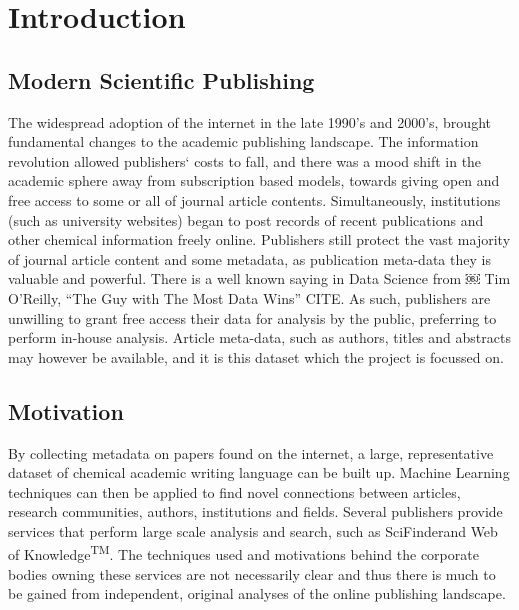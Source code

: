 \chapter{Introduction}
\section{Modern Scientific Publishing}
The widespread adoption of the internet in the late 1990’s and 2000’s, brought  fundamental changes to the academic publishing landscape. The information revolution allowed publishers` costs to fall, and there was a mood shift in the academic sphere away from subscription based models, towards giving open and free access to some or all of journal article contents.
Simultaneously, institutions (such as university websites) began to post records of recent publications and other chemical information freely online. 
Publishers still protect the vast majority of journal article content and some metadata, as publication meta-data they is valuable and powerful. There is a well known saying in Data Science from
￼
Tim O’Reilly, “The Guy with The Most Data Wins” CITE. As such, publishers are unwilling to grant free access their data for analysis by the public, preferring to perform in-house analysis. Article meta-data, such as authors, titles and abstracts may however be available, and it is this dataset which the project is focussed on. 
\section{Motivation}
By collecting metadata on papers found on the internet, a large, representative dataset of chemical academic writing language can be built up. Machine Learning techniques can then be applied to find novel connections between articles, research communities, authors, institutions and fields. Several publishers provide services that perform large scale analysis and search, such as SciFinder\textregistered and Web of Knowledge\textsuperscript{TM}. The techniques used and motivations behind the corporate bodies owning these services are not necessarily clear and thus there is much to be gained from independent, original analyses of the online publishing landscape.
